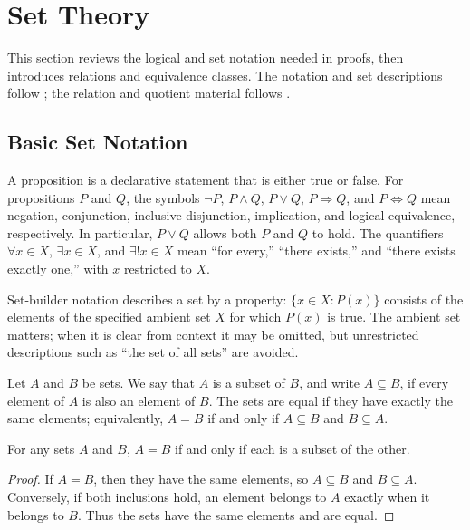 \section{Set Theory}

This section reviews the logical and set notation needed in proofs, then introduces relations and equivalence classes. The notation and set descriptions follow \cite[Section 1.1]{Berberian1998-qc}; the relation and quotient material follows \cite[Sections 1.2 and 1.6]{Berberian1998-qc}.

\subsection{Basic Set Notation}

A proposition is a declarative statement that is either true or false. For propositions $P$ and $Q$, the symbols $\neg P$, $P\land Q$, $P\lor Q$, $P\Rightarrow Q$, and $P\Longleftrightarrow Q$ mean negation, conjunction, inclusive disjunction, implication, and logical equivalence, respectively. In particular, $P\lor Q$ allows both $P$ and $Q$ to hold. The quantifiers $\forall x\in X$, $\exists x\in X$, and $\exists!x\in X$ mean “for every,” “there exists,” and “there exists exactly one,” with $x$ restricted to $X$.

Set-builder notation describes a set by a property: $\{x\in X:P(x)\}$ consists of the elements of the specified ambient set $X$ for which $P(x)$ is true. The ambient set matters; when it is clear from context it may be omitted, but unrestricted descriptions such as “the set of all sets” are avoided.

\begin{definition}
Let $A$ and $B$ be sets. We say that $A$ is a subset of $B$, and write $A\subseteq B$, if every element of $A$ is also an element of $B$. The sets are equal if they have exactly the same elements; equivalently, $A=B$ if and only if $A\subseteq B$ and $B\subseteq A$.
\end{definition}

\begin{proposition}
For any sets $A$ and $B$, $A=B$ if and only if each is a subset of the other.
\end{proposition}

\begin{proof}
If $A=B$, then they have the same elements, so $A\subseteq B$ and $B\subseteq A$. Conversely, if both inclusions hold, an element belongs to $A$ exactly when it belongs to $B$. Thus the sets have the same elements and are equal.
\end{proof}

